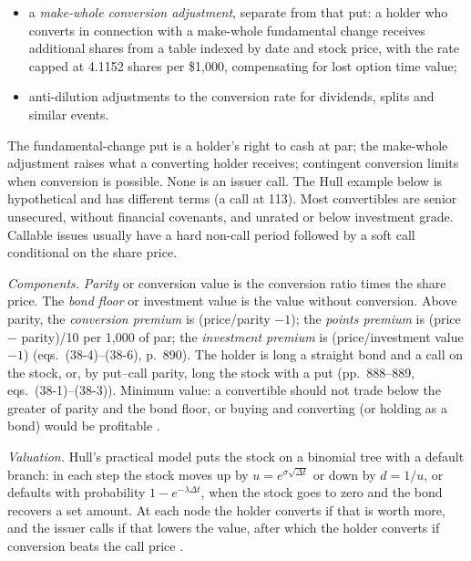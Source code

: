 \begin{qfmethod}
\begin{itemize}
\item a \emph{make-whole conversion adjustment}, separate from that put: a holder who converts in connection with a make-whole fundamental change receives additional shares from a table indexed by date and stock price, with the rate capped at 4.1152 shares per \$1{,}000, compensating for lost option time value;
\item anti-dilution adjustments to the conversion rate for dividends, splits and similar events.
\end{itemize}
The fundamental-change put is a holder's right to cash at par; the make-whole adjustment raises what a converting holder receives; contingent conversion limits when conversion is possible. None is an issuer call. The Hull example below is hypothetical and has different terms (a call at 113).
Most convertibles are senior unsecured, without financial covenants, and unrated or below investment grade. Callable issues usually have a hard non-call period followed by a soft call conditional on the share price.

\emph{Components.} \emph{Parity} or conversion value is the conversion ratio times the share price. The \emph{bond floor} or investment value is the value without conversion. Above parity, the \emph{conversion premium} is (price/parity $-1$); the \emph{points premium} is (price $-$ parity)/10 per 1{,}000 of par; the \emph{investment premium} is (price/investment value $-1$) (eqs.~(38-4)--(38-6), p.~890). The holder is long a straight bond and a call on the stock, or, by put--call parity, long the stock with a put (pp.~888--889, eqs.~(38-1)--(38-3)). Minimum value: a convertible should not trade below the greater of parity and the bond floor, or buying and converting (or holding as a bond) would be profitable \citep[chap.~9, sec.~X.B, p.~249]{fixed-income-analysis-2007}.

\emph{Valuation.} Hull's practical model puts the stock on a binomial tree with a default branch: in each step the stock moves up by $u=e^{\sigma\sqrt{\Delta t}}$ or down by $d=1/u$, or defaults with probability $1-e^{-\lambda\Delta t}$, when the stock goes to zero and the bond recovers a set amount. At each node the holder converts if that is worth more, and the issuer calls if that lowers the value, after which the holder converts if conversion beats the call price \citep[chap.~27, sec.~27.4, pp.~650--653]{s7-hulloptions}.


\end{qfmethod}
